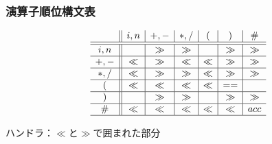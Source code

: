 \documentclass[dvipdfmx,cjk]{beamer}
\begin{document}
\begin{frame}
  \frametitle{演算子順位構文表}
  \[
    \begin{array}{c||c|c|c|c|c|c}
             & i,n & +,- & \ast,/ & (   & )   & \#  \\\hline\hline
      i,n    &     & \gg & \gg    &     & \gg & \gg \\\hline
      +,-    & \ll & \gg & \ll    & \ll & \gg & \gg \\\hline
      \ast,/ & \ll & \gg & \gg    & \ll & \gg & \gg \\\hline
      (      & \ll & \ll & \ll    & \ll & ==  &     \\\hline
      )      &     & \gg & \gg    &     & \gg & \gg \\\hline
      \#     & \ll & \ll & \ll    & \ll & \ll & acc \\\hline
    \end{array}
  \]

  \vspace*{1zw}

  ハンドラ：$\ll$と$\gg$で囲まれた部分

\end{frame}

\newcommand\reduline{\bgroup\markoverwith{\textcolor{red}{\rule[-0.7ex]{2pt}{2pt}}}\ULon}
\end{document}
